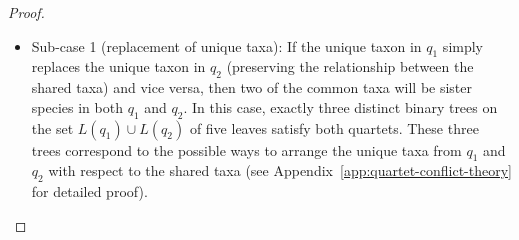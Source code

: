 \documentclass[runningheads]{llncs}
\begin{document}
\begin{proof}
\begin{itemize}
    \begin{itemize} 
        \item Sub-case 1 (replacement of unique taxa): If the unique taxon in $q_1$ simply replaces the unique taxon in $q_2$ (preserving the relationship between the shared taxa) and vice versa, then two of the common taxa will be sister species in both $q_1$ and $q_2$. In this case, exactly three distinct binary trees on the set $L(q_1)\cup L(q_2)$ of five leaves satisfy both quartets. These three trees correspond to the possible ways to arrange the unique taxa from $q_1$ and $q_2$ with respect to the shared taxa (see Appendix~\ref{app:quartet-conflict-theory} for detailed proof).
        
        


\end{itemize}
\end{itemize}
\end{proof}
\end{document}
